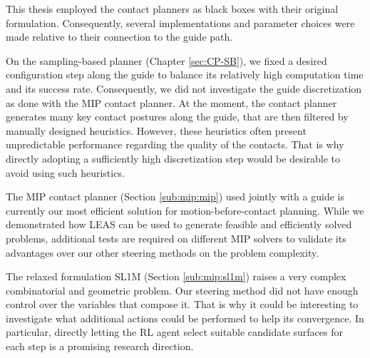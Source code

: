 This thesis employed the contact planners as black boxes with their original formulation. Consequently, several implementations and parameter choices were made relative to their connection to the guide path.

On the sampling-based planner (Chapter \ref{sec:CP-SB}), we fixed a desired configuration step along the guide to balance its relatively high computation time and its success rate. 
Consequently, we did not investigate the guide discretization as done with the MIP contact planner.
At the moment, the contact planner generates many key contact postures along the guide, that are then filtered by manually designed heuristics. 
However, these heuristics often present unpredictable performance regarding the quality of the contacts.
That is why directly adopting a sufficiently high discretization step would be desirable to avoid using such heuristics.

The MIP contact planner (Section \ref{sub:mip:mip}) used jointly with a guide is currently our most efficient solution for motion-before-contact planning.
While we demonstrated how LEAS can be used to generate feasible and efficiently solved problems, additional tests are required on different MIP solvers to validate
its advantages over our other steering methods on the problem complexity.

The relaxed formulation SL1M (Section \ref{sub:mip:sl1m}) raises a very complex combinatorial and geometric problem.
Our steering method did not have enough control over the variables that compose it. That is why it could be interesting to investigate what additional actions could be performed to help its convergence. In particular, directly letting the RL agent select suitable candidate surfaces for each step is a promising research direction.



